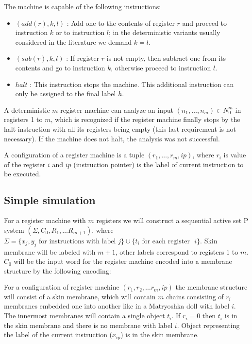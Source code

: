 \documentclass[llncs,submission,copyright,creativecommons]{../lib/lncs/llncs}
\begin{document}
The machine is capable of the following instructions:
\begin{itemize}
  \item $(add(r),k,l)$ : Add one to the contents of register $r$ and proceed to instruction $k$ or to instruction $l$; in the deterministic variants usually considered in the literature we demand $k = l$.
  \item $(sub(r),k,l)$ : If register $r$ is not empty, then subtract one from its contents and go to instruction $k$, otherwise proceed to instruction $l$.
  \item $halt$ : This instruction stops the machine. This additional instruction can only be assigned to the final label $h$.
\end{itemize}

A deterministic $m$-register machine can analyze an input $(n_1,\dots,n_m)\in N_0^m$ in registers 1 to $m$, which is recognized if the register machine finally stops by the halt instruction with all its registers being empty (this last requirement is not necessary). If the machine does not halt, the analysis was not successful.

A configuration of a register machine is a tuple $(r_1, \ldots, r_m, ip)$, where $r_i$ is value of the register $i$ and $ip$ (instruction pointer) is the label of current instruction to be executed.


\subsection{Simple simulation} %
\label{sub:simple_simulation}

For a register machine with $m$ registers we will construct a sequential active set P system $(\Sigma, C_0, R_1, \ldots R_{m+1})$, where $\Sigma = \{x_j, y_j \text{~for instructions with label~} j\}\cup\{t_i \text{~for each register ~}i\}$. Skin membrane will be labeled with $m+1$, other labels correspond to registers 1 to $m$. $C_0$ will be the input word for the register machine encoded into a membrane structure by the following encoding: 

For a configuration of register machine $(r_1, r_2, \ldots r_m, ip)$ the membrane structure will consist of a skin membrane, which will contain $m$ chains consisting of $r_i$ membranes embedded one into another like in a Matryoshka doll with label $i$. The innermost membranes will contain a single object $t_i$. If $r_i = 0$ then $t_i$ is in the skin membrane and there is no membrane with label $i$. Object representing the label of the current instruction ($x_{ip}$) is in the skin membrane.
\end{document}

